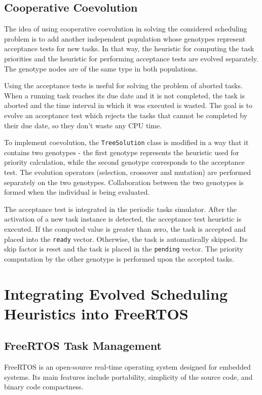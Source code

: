 \subsection{Cooperative Coevolution}
The idea of using cooperative coevolution in solving the considered scheduling problem is to add another independent population whose genotypes represent acceptance tests for new tasks.
In that way, the heuristic for computing the task priorities and the heuristic for performing acceptance tests are evolved separately.
The genotype nodes are of the same type in both populations.

Using the acceptance tests is useful for solving the problem of aborted tasks.
When a running task reaches its due date and it is not completed, the task is aborted and the time interval
in which it was executed is wasted.
The goal is to evolve an acceptance test which rejects the tasks that cannot be completed by their due date, so they don't waste any CPU time.

To implement coevolution, the \texttt{TreeSolution} class is modified in a way that it contains two genotypes - the first genotype represents the heuristic used for priority calculation, while the second genotype corresponds to the acceptance test. 
The evolution operators (selection, crossover and mutation) are performed separately on the two genotypes.
Collaboration between the two genotypes is formed when the individual is being evaluated.

The acceptance test is integrated in the periodic tasks simulator.
After the activation of a new task instance is detected, the acceptance test heuristic is executed.
If the computed value is greater than zero, the task is accepted and placed into the \texttt{ready} vector.
Otherwise, the task is automatically skipped. 
Its skip factor is reset and the task is placed in the \texttt{pending} vector.
The priority computation by the other genotype is performed upon the accepted tasks.

\section{Integrating Evolved Scheduling Heuristics into FreeRTOS}
\subsection{FreeRTOS Task Management}
FreeRTOS is an open-source real-time operating system designed for embedded systems. 
Its main features include portability, simplicity of the source code, and binary code compactness. 

